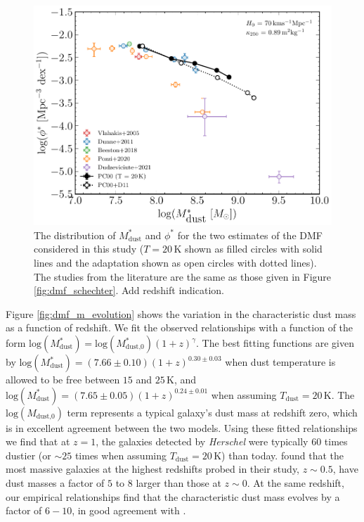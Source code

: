 \begin{figure}
	\centering
	\includegraphics[width=0.8\columnwidth]{Figures/dmf_schechter_parameters.pdf}
	\caption[Distribution of $M_{\textrm{dust}}^*$ and $\phi^*$ from best fitting Schechter functions]{The distribution of $M_{\textrm{dust}}^*$ and $\phi^*$ for the two estimates of the DMF considered in this study ($T = 20\,$K shown as filled circles with solid lines and the \citealt{Dunne_2011} adaptation shown as open circles with dotted lines). The studies from the literature are the same as those given in Figure \ref{fig:dmf_schechter}. {\color{red}Add redshift indication.}}
	\label{fig:dmf_schechter_parameters}
\end{figure}

Figure \ref{fig:dmf_m_evolution} shows the variation in the characteristic dust mass as a function of redshift. We fit the observed relationships with a function of the form $\textrm{log}(M_{\textrm{dust}}^*) = \textrm{log}(M_{\textrm{dust,0}}^*)(1+z)^\gamma$. The best fitting functions are given by $\textrm{log}(M_{\textrm{dust}}^*) = (7.66\pm0.10)(1+z)^{0.30\pm0.03}$ when dust temperature is allowed to be free between $15$ and $25\,$K, and $\textrm{log}(M_{\textrm{dust}}^*) = (7.65\pm0.05)(1+z)^{0.24\pm0.01}$ when assuming $T_{\textrm{dust}} = 20\,$K. The $\textrm{log}(M_{\textrm{dust,0}})$ term represents a typical galaxy's dust mass at redshift zero, which is in excellent agreement between the two models. Using these fitted relationships we find that at $z = 1$, the galaxies detected by \textit{Herschel} were typically $60$ times dustier (or $\sim 25$ times when assuming $T_{\textrm{dust}} = 20\,$K) than today. \citealt{Dunne_2011} found that the most massive galaxies at the highest redshifts probed in their study, $z \sim 0.5$, have dust masses a factor of $5$ to $8$ larger than those at $z \sim 0$. At the same redshift, our empirical relationships find that the characteristic dust mass evolves by a factor of $6 - 10$, in good agreement with \citealt{Dunne_2011}.

